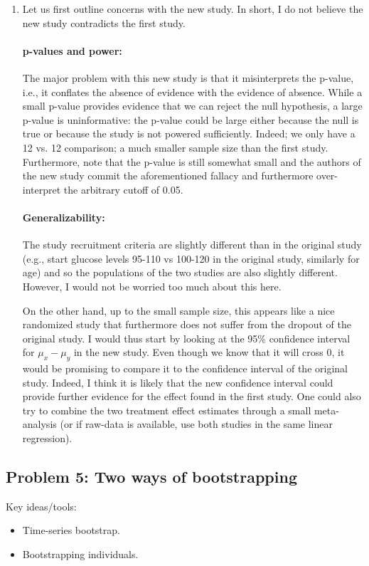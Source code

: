 \begin{enumerate}[label=(\alph*)]
\item Let us first outline concerns with the new study. In short, I do not believe the new study contradicts the first study.
\paragraph{p-values and power:} The major problem with this new study is that it misinterprets the p-value, i.e., it conflates the absence of evidence with the evidence of absence. While a small p-value provides evidence that we can reject the null hypothesis, a large p-value is uninformative: the p-value could be large either because the null is true or because the study is not powered sufficiently. Indeed; we only have a 12 vs. 12 comparison; a much smaller sample size than the first study. Furthermore, note that the p-value is still somewhat small and the authors of the new study commit the aforementioned fallacy and furthermore over-interpret the arbitrary cutoff of 0.05.
\paragraph{Generalizability:} The study recruitment criteria are slightly different than in the original study (e.g., start glucose levels 95-110 vs 100-120 in the original study, similarly for age) and so the populations of the two studies are also slightly different. However, I would not be worried too much about this here.

On the other hand, up to the small sample size, this appears like a nice randomized study that furthermore does not suffer from the dropout of the original study. I would thus start by looking at the 95\% confidence interval for $\mu_x - \mu_y$ in the new study. Even though we know that it will cross $0$, it would be promising to compare it to the confidence interval of the original study. Indeed, I think it is likely that the new confidence interval could provide further evidence for the effect found in the first study. One could also try to combine the two treatment effect estimates through a small meta-analysis (or if raw-data is available, use both studies in the same linear regression).	 

\end{enumerate}

\subsection*{Problem 5: Two ways of bootstrapping}
Key ideas/tools:
\begin{itemize}
  \item Time-series bootstrap.
  \item Bootstrapping individuals.
\end{itemize}

